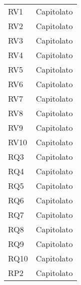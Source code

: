 {\begin{longtable}{C{.47\freewidth} C{.47\freewidth}}
      RV1 & Capitolato\\
      RV2 & Capitolato\\
      RV3 & Capitolato\\
      RV4 & Capitolato\\
      RV5 & Capitolato\\
      RV6 & Capitolato\\
      RV7 & Capitolato\\
      RV8 & Capitolato\\
      RV9 & Capitolato\\
      RV10 & Capitolato\\

      RQ3 & Capitolato\\
      RQ4 & Capitolato\\
      RQ5 & Capitolato\\
      RQ6 & Capitolato\\
      RQ7 & Capitolato\\
      RQ8 & Capitolato\\
      RQ9 & Capitolato\\
      RQ10 & Capitolato\\

      RP2 & Capitolato\\
      \bottomrule
      \end{longtable}
}
